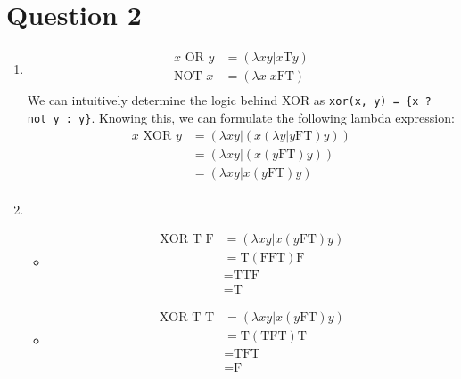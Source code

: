 \documentclass[8pt, letterpaper, titlepage]{article}
\begin{document}
\section*{Question 2}
\begin{enumerate}[label=(\alph*)]
  \item \begin{align}
    x \text{ OR } y &= (\lambda xy | x\text{T}y) \\
    \text{NOT }x &= (\lambda x | x \text{FT}) \\
  \end{align}
We can intuitively determine the logic behind XOR as \lstinline|xor(x, y) = {x ? not y : y}|. Knowing this, we can formulate the following lambda expression:
\begin{align}
  x \text{ XOR } y &= (\lambda x y | (x (\lambda y | y \text{FT})y)) \\
  &= (\lambda x y | (x (y \text{FT})y)) \\
  &= (\lambda x y |x (y \text{FT})y) \\
\end{align} 
\item 
\begin{itemize}
  \item \begin{align}
    \text{XOR T F} &= (\lambda x y |x (y \text{FT})y) \\
    &= \text{T} (\text{F} \text{FT})\text{F} \\
    &= \text{TTF} \\
    &= \text{T}
  \end{align}
  \item \begin{align}
    \text{XOR T T} &= (\lambda x y |x (y \text{FT})y) \\
    &= \text{T} (\text{T} \text{FT})\text{T} \\
    &= \text{TFT} \\
    &= \text{F}
  \end{align}
\end{itemize}
\end{enumerate}
\end{document}
